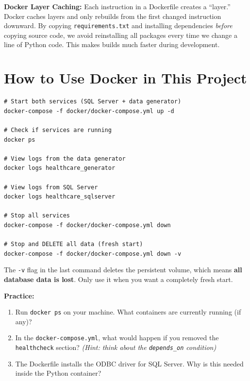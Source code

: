 \documentclass[12pt, a4paper, oneside]{report}
\begin{document}
\begin{tipbox}
    \textbf{Docker Layer Caching:} Each instruction in a Dockerfile creates a ``layer.'' Docker caches layers and only rebuilds from the first changed instruction downward. By copying \texttt{requirements.txt} and installing dependencies \textit{before} copying source code, we avoid reinstalling all packages every time we change a line of Python code. This makes builds much faster during development.
\end{tipbox}

\section{How to Use Docker in This Project}

\begin{lstlisting}[style=bashstyle, caption={Docker commands for local development}]
# Start both services (SQL Server + data generator)
docker-compose -f docker/docker-compose.yml up -d

# Check if services are running
docker ps

# View logs from the data generator
docker logs healthcare_generator

# View logs from SQL Server
docker logs healthcare_sqlserver

# Stop all services
docker-compose -f docker/docker-compose.yml down

# Stop and DELETE all data (fresh start)
docker-compose -f docker/docker-compose.yml down -v
\end{lstlisting}

\begin{warningbox}
    The \texttt{-v} flag in the last command deletes the persistent volume, which means \textbf{all database data is lost}. Only use it when you want a completely fresh start.
\end{warningbox}

\begin{exercisebox}
\textbf{Practice:}
\begin{enumerate}
    \item Run \texttt{docker ps} on your machine. What containers are currently running (if any)?
    \item In the \texttt{docker-compose.yml}, what would happen if you removed the \texttt{healthcheck} section? \textit{(Hint: think about the \texttt{depends\_on} condition)}
    \item The Dockerfile installs the ODBC driver for SQL Server. Why is this needed inside the Python container?
\end{enumerate}
\end{exercisebox}
\end{document}
